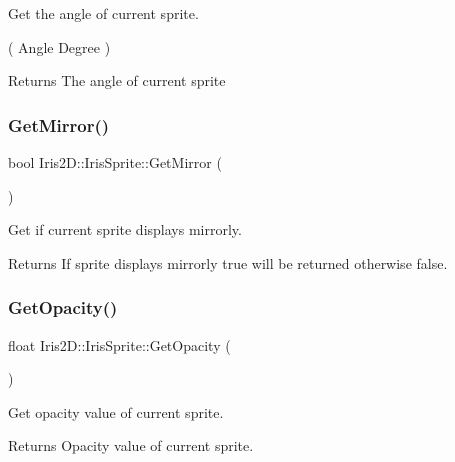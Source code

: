 Get the angle of current sprite. 

( Angle Degree ) \begin{DoxyReturn}{Returns}
The angle of current sprite 
\end{DoxyReturn}
\mbox{\label{class_iris2_d_1_1_iris_sprite_a5c4fa95fdadbb42ec65047b87786ec51}} 
\subsubsection{\texorpdfstring{Get\+Mirror()}{GetMirror()}}
{\footnotesize\ttfamily bool Iris2\+D\+::\+Iris\+Sprite\+::\+Get\+Mirror (\begin{DoxyParamCaption}{ }\end{DoxyParamCaption})}



Get if current sprite displays mirrorly. 

\begin{DoxyReturn}{Returns}
If sprite displays mirrorly true will be returned otherwise false. 
\end{DoxyReturn}
\mbox{\label{class_iris2_d_1_1_iris_sprite_a59358690f1becb15facd176a9bba4096}} 
\subsubsection{\texorpdfstring{Get\+Opacity()}{GetOpacity()}}
{\footnotesize\ttfamily float Iris2\+D\+::\+Iris\+Sprite\+::\+Get\+Opacity (\begin{DoxyParamCaption}{ }\end{DoxyParamCaption})}



Get opacity value of current sprite. 

\begin{DoxyReturn}{Returns}
Opacity value of current sprite. 
\end{DoxyReturn}
\mbox{\label{class_iris2_d_1_1_iris_sprite_a134ad89bea2b664a912574737bd418e5}} 
